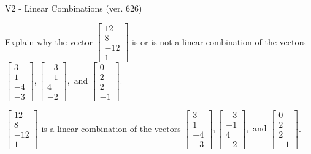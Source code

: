 \begin{exercise}
  \begin{exerciseTitle}V2 - Linear Combinations (ver. 626)\end{exerciseTitle}
  \begin{exerciseStatement}
    Explain why the vector \(\left[\begin{array}{c}
12 \\
8 \\
-12 \\
1
\end{array}\right]\)  is or is not a linear 
	combination of the vectors \(\left[\begin{array}{c}
3 \\
1 \\
-4 \\
-3
\end{array}\right] , \left[\begin{array}{c}
-3 \\
-1 \\
4 \\
-2
\end{array}\right] , \text{ and } \left[\begin{array}{c}
0 \\
2 \\
2 \\
-1
\end{array}\right]\).
	


  \end{exerciseStatement}
  \begin{exerciseAnswer}
   \(\left[\begin{array}{c}
12 \\
8 \\
-12 \\
1
\end{array}\right]\) 
  	 is  
	a linear combination of the vectors \(\left[\begin{array}{c}
3 \\
1 \\
-4 \\
-3
\end{array}\right] , \left[\begin{array}{c}
-3 \\
-1 \\
4 \\
-2
\end{array}\right] , \text{ and } \left[\begin{array}{c}
0 \\
2 \\
2 \\
-1
\end{array}\right]\).

	
  


  \end{exerciseAnswer}
\end{exercise}